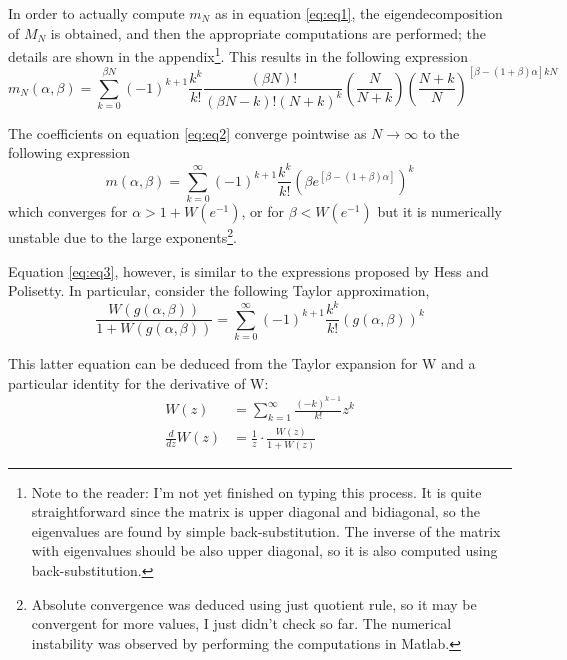 \documentclass{article}
\newcommand{\ppar}[1]{\left( #1 \right)}
\newcommand{\spar}[1]{\left[ #1 \right]}
\begin{document}
In order to actually compute $m_N$ as in equation \eqref{eq:eq1}, the eigendecomposition of $M_N$ is obtained, and then the appropriate computations are performed; the details are shown in the appendix\footnote{Note to the reader: I'm not yet finished on typing this process. It is quite straightforward since the matrix is upper diagonal and bidiagonal, so the eigenvalues are found by simple back-substitution. The inverse of the matrix with eigenvalues should be also upper diagonal, so it is also computed using back-substitution.}. This results in the following expression
\begin{equation}
    m_N(\alpha, \beta) =
    \sum_{k=0}^{\beta N}
    (-1)^{k+1} \frac{k^k}{k!} 
    \frac{\ppar{\beta N}!}{\ppar{\beta N-k}! (N+k)^k} \ppar{\frac{N}{N+k}}
    \ppar{\frac{N+k}{N}}^{\spar{\beta-(1+\beta)\alpha}k N}
    \label{eq:eq2}
\end{equation}

The coefficients on equation \eqref{eq:eq2} converge pointwise as $N\rightarrow \infty$ to the following expression
\begin{equation}
    m(\alpha, \beta) =
    \sum_{k=0}^{\infty}
    (-1)^{k+1} \frac{k^k}{k!} 
    \ppar{\beta
    e^{\spar{\beta-(1+\beta)\alpha}} }^k
    \label{eq:eq3}
\end{equation}
which converges for $\alpha>1+W\ppar{e^{-1}}$, or for $\beta< W\ppar{e^{-1}}$ but it is numerically unstable due to the large exponents\footnote{Absolute convergence was deduced using just quotient rule, so it may be convergent for more values, I just didn't check so far. The numerical instability was observed by performing the computations in Matlab.}.

Equation \eqref{eq:eq3}, however, is similar to the expressions proposed by Hess and Polisetty. In particular, consider the following Taylor approximation,
\begin{equation}
    \frac{W\ppar{g\ppar{\alpha, \beta}}}{1+W\ppar{g\ppar{\alpha, \beta}}}
    =
    \sum_{k=0}^{\infty}
    (-1)^{k+1} \frac{k^k}{k!} 
    \ppar{g\ppar{\alpha, \beta}}^k
\end{equation}

This latter equation can be deduced from the Taylor expansion for W and a particular identity for the derivative of W:
\begin{align}
    W(z) 
    &=
    \sum_{k=1}^\infty 
    \frac{(-k)^{k-1}}{k!} z^k \\
    \frac{d}{dz} W(z) 
    &=
    \frac{1}{z} \cdot \frac{W(z)}{1+W(z)}
\end{align}
\end{document}
